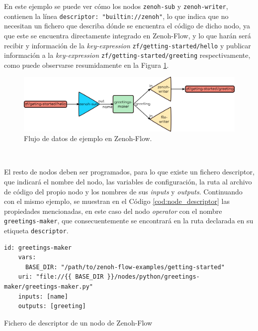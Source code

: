 En este ejemplo se puede ver cómo los nodos \verb|zenoh-sub| y
\verb|zenoh-writer|, contienen la línea \verb|descriptor: "builtin://zenoh"|, lo
que indica que no necesitan un fichero que describa dónde se encuentra el código
de dicho nodo, ya que este se encuentra directamente integrado en Zenoh-Flow, y
lo que harán será recibir y información de la \textit{key-expression}
\verb|zf/getting-started/hello| y publicar información a la
\textit{key-expression} \verb|zf/getting-started/greeting| respectivamente, como
puede observarse resumidamente en la Figura \ref{fig:zf_example}.
\\

\begin{figure} [h!]
  \begin{center}
    \includegraphics[width=15cm]{figs/zenoh_flow_example}
  \end{center}
  \caption{Flujo de datos de ejemplo en Zenoh-Flow.}
  \label{fig:zf_example}
\end{figure}\

El resto de nodos deben ser programados, para lo que existe un fichero
descriptor, que indicará el nombre del nodo, las variables de configuración, la
ruta al archivo de código del propio nodo y los nombres de sus \textit{inputs} y
\textit{outputs}.
Continuando con el mismo ejemplo, se muestran en el Código
\ref{cod:node_descriptor} las propiedades mencionadas, en este caso del nodo
\textit{operator} con el nombre \verb|greetings-maker|, que consecuentemente se
encontrará en la ruta declarada en su etiqueta \verb|descriptor|.
\\

\begin{code}[h!]
  \begin{lstlisting}[style=yaml]
    id: greetings-maker
    vars:
      BASE_DIR: "/path/to/zenoh-flow-examples/getting-started"
    uri: "file://{{ BASE_DIR }}/nodes/python/greetings-maker/greetings-maker.py"
    inputs: [name]
    outputs: [greeting]
  \end{lstlisting}
\caption[Fichero de descriptor de un nodo de Zenoh-Flow]{Fichero de descriptor de un nodo de Zenoh-Flow}
\label{cod:node_descriptor}
\end{code}


